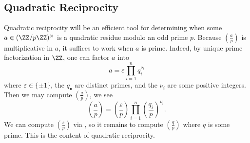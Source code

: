 \documentclass[../notes.tex]{subfiles}
\begin{document}
\subsection{Quadratic Reciprocity}
Quadratic reciprocity will be an efficient tool for determining when some $a\in(\ZZ/p\ZZ)^\times$ is a quadratic residue modulo an odd prime $p$. Because $\left(\frac ap\right)$ is multiplicative in $a$, it suffices to work when $a$ is prime. Indeed, by unique prime factorization in $\ZZ$, one can factor $a$ into
\[a=\varepsilon\prod_{i=1}^nq_i^{\nu_i}\]
where $\varepsilon\in\{\pm1\}$, the $q_\bullet$ are distinct primes, and the $\nu_i$ are some positive integers. Then we may compute $\left(\frac ap\right)$, we see
\[\left(\frac ap\right)=\left(\frac\varepsilon p\right)\prod_{i=1}^n\left(\frac{q_i}p\right)^{\nu_i}.\]
We can compute $\left(\frac\varepsilon p\right)$ via , so it remains to compute $\left(\frac qp\right)$ where $q$ is some prime. This is the content of quadratic reciprocity.
\end{document}
